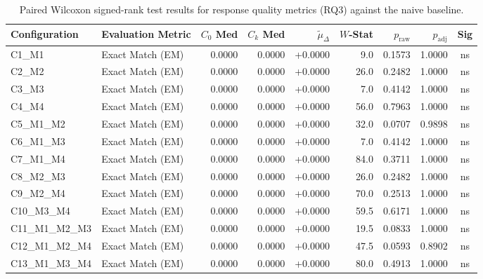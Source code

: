 \begin{table}[p]
\centering
\scriptsize
\setlength{\tabcolsep}{2.4pt}
\renewcommand{\arraystretch}{0.92}
\caption{Paired Wilcoxon signed-rank test results for response quality metrics (RQ3) against the naive baseline.}
\label{tab:wilcoxon_rq3}
\begin{tabular*}{\textwidth}{@{\extracolsep{\fill}} l l r r r r r r c @{}}
\toprule
\textbf{Configuration} & \textbf{Evaluation Metric} & \textbf{$C_0$ Med} & \textbf{$C_k$ Med} & \textbf{$\tilde{\mu}_\Delta$} & \textbf{$W$-Stat} & \textbf{$p_{\text{raw}}$} & \textbf{$p_{\text{adj}}$} & \textbf{Sig} \\
\midrule
C1\_M1          & Exact Match (EM)     & 0.0000 & 0.0000 & +0.0000 & 9.0 & 0.1573 & 1.0000 & ns \\
\addlinespace
C2\_M2          & Exact Match (EM)     & 0.0000 & 0.0000 & +0.0000 & 26.0 & 0.2482 & 1.0000 & ns \\
\addlinespace
C3\_M3          & Exact Match (EM)     & 0.0000 & 0.0000 & +0.0000 & 7.0 & 0.4142 & 1.0000 & ns \\
\addlinespace
C4\_M4          & Exact Match (EM)     & 0.0000 & 0.0000 & +0.0000 & 56.0 & 0.7963 & 1.0000 & ns \\
\addlinespace
C5\_M1\_M2      & Exact Match (EM)     & 0.0000 & 0.0000 & +0.0000 & 32.0 & 0.0707 & 0.9898 & ns \\
\addlinespace
C6\_M1\_M3      & Exact Match (EM)     & 0.0000 & 0.0000 & +0.0000 & 7.0 & 0.4142 & 1.0000 & ns \\
\addlinespace
C7\_M1\_M4      & Exact Match (EM)     & 0.0000 & 0.0000 & +0.0000 & 84.0 & 0.3711 & 1.0000 & ns \\
\addlinespace
C8\_M2\_M3      & Exact Match (EM)     & 0.0000 & 0.0000 & +0.0000 & 26.0 & 0.2482 & 1.0000 & ns \\
\addlinespace
C9\_M2\_M4      & Exact Match (EM)     & 0.0000 & 0.0000 & +0.0000 & 70.0 & 0.2513 & 1.0000 & ns \\
\addlinespace
C10\_M3\_M4     & Exact Match (EM)     & 0.0000 & 0.0000 & +0.0000 & 59.5 & 0.6171 & 1.0000 & ns \\
\addlinespace
C11\_M1\_M2\_M3 & Exact Match (EM)     & 0.0000 & 0.0000 & +0.0000 & 19.5 & 0.0833 & 1.0000 & ns \\
\addlinespace
C12\_M1\_M2\_M4 & Exact Match (EM)     & 0.0000 & 0.0000 & +0.0000 & 47.5 & 0.0593 & 0.8902 & ns \\
\addlinespace
C13\_M1\_M3\_M4 & Exact Match (EM)     & 0.0000 & 0.0000 & +0.0000 & 80.0 & 0.4913 & 1.0000 & ns \\

\end{tabular*}
\end{table}
